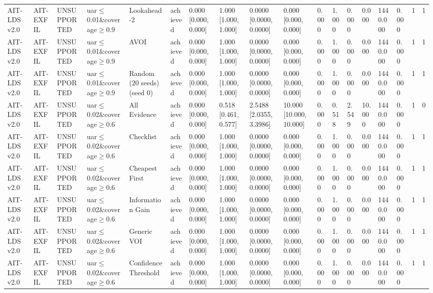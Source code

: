 \begin{table}[!ht]
{\begin{tabular}{llllllllllllllllll}
AIT-LDS v2.0 & AIT-EXFIL & UNSUPPORTED & uar$\le$0.01\&coverage$\ge$0.9 & Lookahead-2 & achieved & 0.000 [0.000, 0.000] & 1.000 [1.000, 1.000] & 0.0000 [0.0000, 0.0000] & 0.000 [0.000, 0.000] & 0.000 & 1.000 & 0.000 & 0.000 & 1440.000 & 0.000 & 1 & 1 \\
AIT-LDS v2.0 & AIT-EXFIL & UNSUPPORTED & uar$\le$0.01\&coverage$\ge$0.9 & AVOI & achieved & 0.000 [0.000, 0.000] & 1.000 [1.000, 1.000] & 0.0000 [0.0000, 0.0000] & 0.000 [0.000, 0.000] & 0.000 & 1.000 & 0.000 & 0.000 & 1440.000 & 0.000 & 1 & 1 \\
AIT-LDS v2.0 & AIT-EXFIL & UNSUPPORTED & uar$\le$0.01\&coverage$\ge$0.9 & Random (20 seeds) (seed 0) & achieved & 0.000 [0.000, 0.000] & 1.000 [1.000, 1.000] & 0.0000 [0.0000, 0.0000] & 0.000 [0.000, 0.000] & 0.000 & 1.000 & 0.000 & 0.000 & 1440.000 & 0.000 & 1 & 1 \\
AIT-LDS v2.0 & AIT-EXFIL & UNSUPPORTED & uar$\le$0.02\&coverage$\ge$0.6 & All Evidence & achieved & 0.000 [0.000, 0.000] & 0.518 [0.461, 0.577] & 2.5488 [2.0355, 3.3986] & 10.000 [10.000, 10.000] & 0.000 & 0.518 & 2.549 & 10.000 & 1440.000 & 0.000 & 1 & 0 \\
AIT-LDS v2.0 & AIT-EXFIL & UNSUPPORTED & uar$\le$0.02\&coverage$\ge$0.6 & Checklist & achieved & 0.000 [0.000, 0.000] & 1.000 [1.000, 1.000] & 0.0000 [0.0000, 0.0000] & 0.000 [0.000, 0.000] & 0.000 & 1.000 & 0.000 & 0.000 & 1440.000 & 0.000 & 1 & 1 \\
AIT-LDS v2.0 & AIT-EXFIL & UNSUPPORTED & uar$\le$0.02\&coverage$\ge$0.6 & Cheapest First & achieved & 0.000 [0.000, 0.000] & 1.000 [1.000, 1.000] & 0.0000 [0.0000, 0.0000] & 0.000 [0.000, 0.000] & 0.000 & 1.000 & 0.000 & 0.000 & 1440.000 & 0.000 & 1 & 1 \\
AIT-LDS v2.0 & AIT-EXFIL & UNSUPPORTED & uar$\le$0.02\&coverage$\ge$0.6 & Information Gain & achieved & 0.000 [0.000, 0.000] & 1.000 [1.000, 1.000] & 0.0000 [0.0000, 0.0000] & 0.000 [0.000, 0.000] & 0.000 & 1.000 & 0.000 & 0.000 & 1440.000 & 0.000 & 1 & 1 \\
AIT-LDS v2.0 & AIT-EXFIL & UNSUPPORTED & uar$\le$0.02\&coverage$\ge$0.6 & Generic VOI & achieved & 0.000 [0.000, 0.000] & 1.000 [1.000, 1.000] & 0.0000 [0.0000, 0.0000] & 0.000 [0.000, 0.000] & 0.000 & 1.000 & 0.000 & 0.000 & 1440.000 & 0.000 & 1 & 1 \\
AIT-LDS v2.0 & AIT-EXFIL & UNSUPPORTED & uar$\le$0.02\&coverage$\ge$0.6 & Confidence Threshold & achieved & 0.000 [0.000, 0.000] & 1.000 [1.000, 1.000] & 0.0000 [0.0000, 0.0000] & 0.000 [0.000, 0.000] & 0.000 & 1.000 & 0.000 & 0.000 & 1440.000 & 0.000 & 1 & 1 \\

\end{tabular}}
\end{table}
